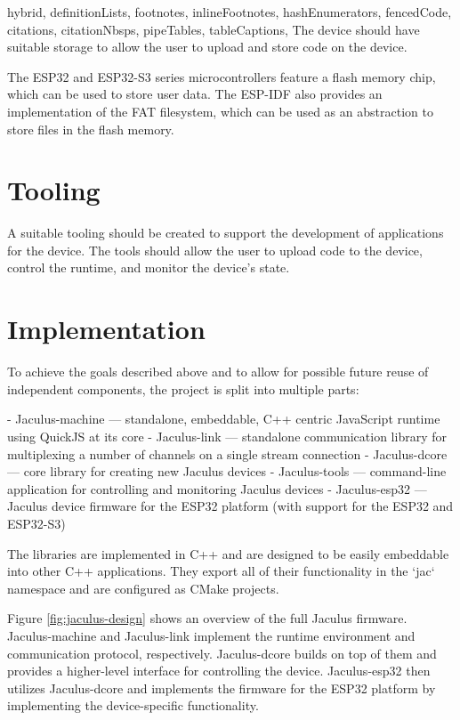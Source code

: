 \begin{markdown*}{%
  hybrid,
  definitionLists,
  footnotes,
  inlineFootnotes,
  hashEnumerators,
  fencedCode,
  citations,
  citationNbsps,
  pipeTables,
  tableCaptions,
}
The device should have suitable storage to allow the user to upload and store code on the device.

The ESP32 and ESP32-S3 series microcontrollers feature a flash memory chip, which can be used to store user data. The ESP-IDF also provides an implementation of the FAT filesystem, which can be used as an abstraction to store files in the flash memory.

\section{Tooling}

A suitable tooling should be created to support the development of applications for the device. The tools should allow the user to upload code to the device, control the runtime, and monitor the device's state.

\section{Implementation}


To achieve the goals described above and to allow for possible future reuse of independent components, the project is split into multiple parts:

  - Jaculus-machine --- standalone, embeddable, C++ centric JavaScript runtime using QuickJS at its core
  - Jaculus-link --- standalone communication library for multiplexing a number of channels on a single stream connection
  - Jaculus-dcore --- core library for creating new Jaculus devices
  - Jaculus-tools --- command-line application for controlling and monitoring Jaculus devices
  - Jaculus-esp32 --- Jaculus device firmware for the ESP32 platform (with support for the ESP32 and ESP32-S3)

The libraries are implemented in C++ and are designed to be easily embeddable into other C++ applications. They export all of their functionality in the `jac` namespace and are configured as CMake projects.

Figure \ref{fig:jaculus-design} shows an overview of the full Jaculus firmware. Jaculus-machine and Jaculus-link implement the runtime environment and communication protocol, respectively. Jaculus-dcore builds on top of them and provides a higher-level interface for controlling the device. Jaculus-esp32 then utilizes Jaculus-dcore and implements the firmware for the ESP32 platform by implementing the device-specific functionality.


\end{markdown*}
